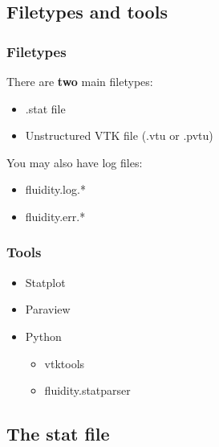 \documentclass[12pt]{beamer}
\begin{document}
\subsection{Filetypes and tools}
\begin{frame}
    \frametitle{Filetypes}
There are \textbf{two} main filetypes:
\begin{itemize}
    \item .stat file
    \item Unstructured VTK file (.vtu or .pvtu)
\end{itemize}
\vspace{5mm}
You may also have log files:
\begin{itemize}
    \item fluidity.log.*
    \item fluidity.err.*
\end{itemize}

\end{frame}

\begin{frame}
    \frametitle{Tools}
\begin{itemize}
\item Statplot
\item Paraview
\item Python
    \begin{itemize}
    \item vtktools
    \item fluidity.statparser
    \end{itemize}
\end{itemize}
\end{frame}

\subsection{The stat file}
\end{document}
